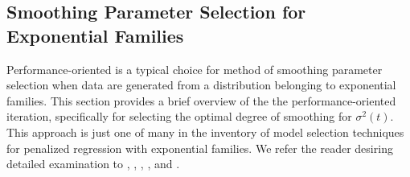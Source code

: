 
\subsection{Smoothing Parameter Selection for Exponential Families} \label{smoothing-parameter-selection-exponential-families}
Performance-oriented is a typical choice for method of smoothing parameter selection when data are generated from a distribution belonging to exponential families. This section provides a brief overview of the the performance-oriented iteration, specifically for selecting the optimal degree of smoothing for $\sigma^2\left(t\right)$. This approach is just one of many in the inventory of model selection techniques for penalized regression with exponential families. We refer the reader desiring detailed examination to \cite{zhang2006component}, \cite{xiang1996generalized}, \cite{wahba1995smoothing},  \cite{wood2004stable}, and \cite{wood2017generalized}. 

\bigskip

